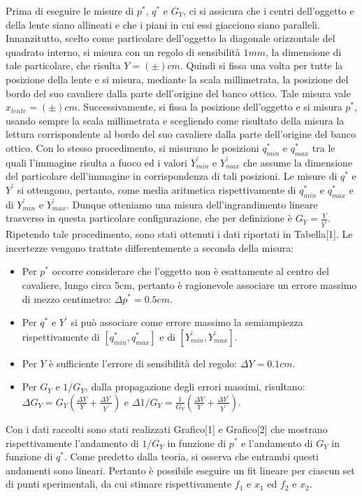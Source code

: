 \documentclass{article}
\begin{document}
Prima di eseguire le misure di $p^*$, $q^*$ e $G_Y$, ci si assicura che i centri dell'oggetto e della lente siano allineati e che i piani in cui essi giacciono siano paralleli. Innanzitutto, scelto come particolare dell'oggetto la diagonale orizzontale del quadrato interno, si misura con un regolo di sensibilità $1mm$, la dimensione di tale particolare, che risulta $Y=(\pm)cm$. Quindi si fissa una volta per tutte la posizione della lente e si misura, mediante la scala millimetrata, la posizione del bordo del suo cavaliere dalla parte dell'origine del banco ottico. Tale misura vale $x_{lente}=(\pm)cm$. Successivamente, si fissa la posizione dell'oggetto e si misura $p^*$, usando sempre la scala millimetrata e scegliendo come risultato della misura la lettura corrispondente al bordo del suo cavaliere dalla parte dell'origine del banco ottico. Con lo stesso procedimento, si misurano le posizioni $q^*_{min}$ e $q^*_{max}$ tra le quali l'immagine risulta a fuoco ed i valori $Y^'_{min}$ e $Y^'_{max}$ che assume la dimensione del particolare dell'immagine in corrispondenza di tali posizioni. Le misure di $q^*$ e $Y^'$ si ottengono, pertanto, come media aritmetica rispettivamente di $q^*_{min}$ e $q^*_{max}$ e di $Y^'_{min}$ e $Y^'_{max}$. Dunque otteniamo una misura dell'ingrandimento lineare trasverso in questa particolare configurazione, che per definizione è $G_Y = \frac{Y}{Y^'}$. Ripetendo tale procedimento, sono stati ottenuti i dati riportati in Tabella[1]. Le incertezze vengono trattate differentemente a seconda della misura:
\begin{itemize}
\item Per $p^*$ occorre considerare che l'oggetto non è esattamente al centro del cavaliere, lungo circa 5cm, pertanto è ragionevole associare un errore massimo di mezzo centimetro: $\Delta p^* = 0.5 cm$.
\item Per $q^*$ e $Y^'$ si può associare come errore massimo la semiampiezza rispettivamente di $[q^*_{min},q^*_{max}]$ e di $[Y^'_{min},Y^'_{max}]$.
\item Per $Y$ è sufficiente l'errore di sensibilità del regolo: $\Delta Y = 0.1 cm$.
\item Per $G_Y$ e $1/G_Y$, dalla propagazione degli errori massimi, risultano: $\Delta G_Y = G_Y (\frac{\Delta Y}{Y}+\frac{\Delta Y^'}{Y^'})$ e
$\Delta 1/G_Y = \frac{1}{G_Y} (\frac{\Delta Y}{Y}+\frac{\Delta Y^'}{Y^'})$.
\end{itemize}
Con i dati raccolti sono stati realizzati Grafico[1] e Grafico[2] che mostrano rispettivamente l'andamento di $1/G_Y$ in funzione di $p^*$ e l'andamento di $G_Y$ in funzione di $q^*$. Come predetto dalla teoria, si osserva che entrambi questi andamenti sono lineari. Pertanto è possibile eseguire un fit lineare per ciascun set di punti sperimentali, da cui stimare rispettivamente $f_1$ e $x_1$ ed $f_2$ e $x_2$.
\end{document}
